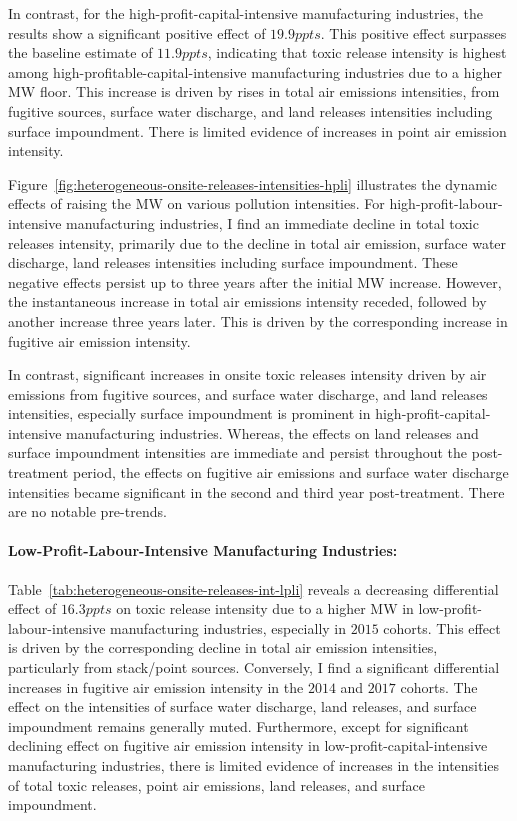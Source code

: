 \documentclass[12pt, english]{article}
\begin{document}
    In contrast, for the high-profit-capital-intensive manufacturing industries, the results show a significant positive effect of $19.9ppts$. This positive effect surpasses the baseline estimate of $11.9ppts$, indicating that toxic release intensity is highest among high-profitable-capital-intensive manufacturing industries due to a higher MW floor. This increase is driven by rises in total air emissions intensities, from fugitive sources, surface water discharge, and land releases intensities including surface impoundment. There is limited evidence of increases in point air emission intensity.

    Figure~\ref{fig:heterogeneous-onsite-releases-intensities-hpli} illustrates the dynamic effects of raising the MW on various pollution intensities. For high-profit-labour-intensive manufacturing industries, I find an immediate decline in total toxic releases intensity, primarily due to the decline in total air emission, surface water discharge, land releases intensities including surface impoundment. These negative effects persist up to three years after the initial MW increase. However, the instantaneous increase in total air emissions intensity receded, followed by another increase three years later. This is driven by the corresponding increase in fugitive air emission intensity.
    

    In contrast, significant increases in onsite toxic releases intensity driven by air emissions from fugitive sources, and surface water discharge, and land releases intensities, especially surface impoundment is prominent in high-profit-capital-intensive manufacturing industries. Whereas, the effects on land releases and surface impoundment intensities are immediate and persist throughout the post-treatment period, the effects on fugitive air emissions and surface water discharge intensities became significant in the second and third year post-treatment. There are no notable pre-trends.

    \paragraph{Low-Profit-Labour-Intensive Manufacturing Industries:}
    Table~\ref{tab:heterogeneous-onsite-releases-int-lpli} reveals a decreasing differential effect of $16.3ppts$ on toxic release intensity due to a higher MW in low-profit-labour-intensive manufacturing industries, especially in $2015$ cohorts. This effect is driven by the corresponding decline in total air emission intensities, particularly from stack/point sources. Conversely, I find a significant differential increases in fugitive air emission intensity in the $2014$ and $2017$ cohorts. The effect on the intensities of surface water discharge, land releases, and surface impoundment remains generally muted. Furthermore, except for significant declining effect on fugitive air emission intensity in low-profit-capital-intensive manufacturing industries, there is limited evidence of increases in the intensities of total toxic releases, point air emissions, land releases, and surface impoundment.
    
\end{document}

